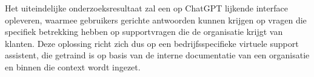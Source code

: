 Het uiteindelijke onderzoeksresultaat zal een op ChatGPT lijkende interface opleveren, waarmee gebruikers gerichte antwoorden kunnen krijgen op vragen die specifiek betrekking hebben op supportvragen die de organisatie krijgt van klanten. Deze oplossing richt zich dus op een bedrijfsspecifieke virtuele support assistent, die getraind is op basis van de interne documentatie van een organisatie en binnen die context wordt ingezet.


